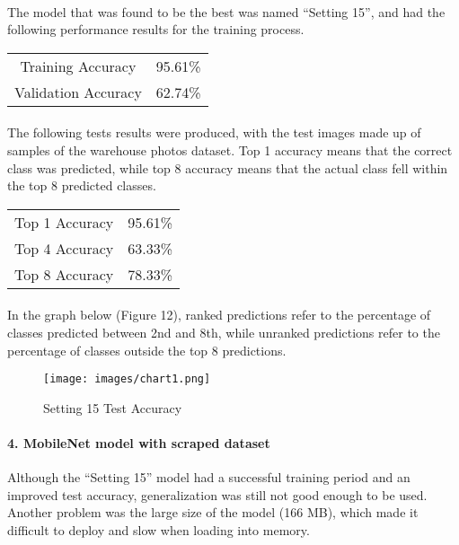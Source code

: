 \documentclass[a4paper, 11pt]{article}
\begin{document}
        \paragraph{}
        The model that was found to be the best was named “Setting 15”, and had the following performance results for the training process.
        \begin{center}
        \begin{tabular}{ |c|c| } 
         \hline
         Training Accuracy & 95.61\%\\
         Validation Accuracy & 62.74\%\\
         \hline
        \end{tabular}
        \end{center}
        \paragraph{}
        The following tests results were produced, with the test images made up of samples of the warehouse photos dataset. Top 1 accuracy means that the correct class was predicted, while top 8 accuracy means that the actual class fell within the top 8 predicted classes.
        \begin{center}
        \begin{tabular}{ |c|c| } 
         \hline
         Top 1 Accuracy & 95.61\%\\
         Top 4 Accuracy & 63.33\%\\
         Top 8 Accuracy & 78.33\%\\
         \hline
        \end{tabular}
        \end{center}
        \paragraph{}
        In the graph below (Figure 12), ranked predictions refer to the percentage of classes predicted between 2nd and 8th, while unranked predictions refer to the percentage of classes outside the top 8 predictions.
        \begin{figure}[H]
            \texttt{[image: images/chart1.png]}
            \caption{Setting 15 Test Accuracy}
            \label{fig:test15}
        \end{figure}
        
        \paragraph{4. MobileNet model with scraped dataset}
        Although the “Setting 15” model had a successful training period and an improved test accuracy, generalization was still not good enough to be used. Another problem was the large size of the model (166 MB), which made it difficult to deploy and slow when loading into memory.
\end{document}

